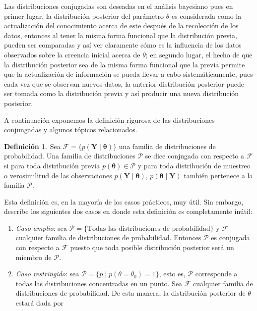 \documentclass[
  10pt,
  spanish,
]{book}
\theoremstyle{definition}
\newtheorem{definition}{Definición}[chapter]
\theoremstyle{definition}
\theoremstyle{definition}
\theoremstyle{definition}
\theoremstyle{remark}
\begin{document}
Las distribuciones conjugadas son deseadas en el análisis bayesiano pues
en primer lugar, la distribución posterior del parámetro \(\theta\) es
considerada como la actualización del conocimiento acerca de este
después de la recolección de los datos, entonces al tener la misma forma
funcional que la distribución previa, pueden ser comparadas y así
ver claramente cómo es la influencia de los datos observados sobre la
creencia inicial acerca de \(\theta\); en segundo lugar, el hecho de que la
distribución posterior sea de la misma forma funcional que la previa
permite que la actualización de información se pueda llevar a cabo
sistemáticamente, pues cada vez que se observan nuevos datos, la
anterior distribución posterior puede ser tomada como la distribución
previa y así producir una nueva distribución posterior.

A continuación exponemos la definición rigurosa de las distribuciones
conjungadas y algunos tópicos relacionados.

\begin{definition}
\protect\hypertarget{def:unnamed-chunk-1}{}{\label{def:unnamed-chunk-1} }Sea \(\mathcal{F}=\{p(\mathbf{Y} \mid \boldsymbol \theta)\}\) una familia de distribuciones de probabilidad. Una familia de distribuciones \(\mathcal{P}\) se dice conjugada con respecto a \(\mathcal{F}\) si para toda distribución previa \(p(\boldsymbol \theta) \in \mathcal{P}\) y para toda distribución de muestreo o verosimilitud de las observaciones \(p(\mathbf{Y} \mid \boldsymbol \theta)\), \(p(\boldsymbol \theta\mid \mathbf{Y})\) también pertenece a la familia \(\mathcal{P}\).
\end{definition}

Esta definición es, en la mayoría de los casos prácticos, muy útil. Sin
embargo, \citet{Migon} describe los siguientes dos casos en donde
esta definición es completamente inútil:

\begin{enumerate}
\def\labelenumi{\arabic{enumi}.}
\item
  \emph{Caso amplio}: sea
  \(\mathcal{P}=\{\text{Todas las distribuciones de probabilidad}\}\) y
  \(\mathcal{F}\) cualquier familia de distribuciones de probabilidad.
  Entonces \(\mathcal{P}\) es conjugada con respecto a \(\mathcal{F}\) puesto
  que toda posible distribución posterior será un miembro de
  \(\mathcal{P}\).
\item
  \emph{Caso restringido}: sea \(\mathcal{P}=\{p \mid p(\theta=\theta_0)=1\}\),
  esto es, \(\mathcal{P}\) corresponde a todas las distribuciones
  concentradas en un punto. Sea \(\mathcal{F}\) cualquier familia de
  distribuciones de probabilidad. De esta manera, la distribución
  posterior de \(\theta\) estará dada por
\end{enumerate}
\end{document}

